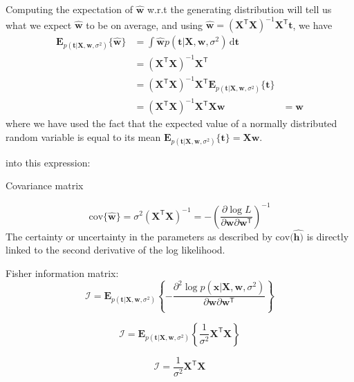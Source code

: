 \documentclass[a4paper,11pt]{article} %
\begin{document}
Computing the expectation of $\hat{\mathbf{w}}$ w.r.t the generating distribution will tell us
what we expect $\hat{\mathbf{w}}$ to be on average, and using
$\hat{\mathbf{w}} = (\mathbf{X}^{\mathsf{T}}\mathbf{X})^{-1}\mathbf{X}^{\mathsf{T}}\mathbf{t}$,
we have
\begin{align*}
\mathbf{E}_{p(\mathbf{t}|\mathbf{X},\mathbf{w},\sigma^2)}\{\hat{\mathbf{w}}\} & =
\int \hat{\mathbf{w}} p(\mathbf{t}|\mathbf{X},\mathbf{w},\sigma^2)\,\mathrm{d}\mathbf{t} \\
& = (\mathbf{X}^{\mathsf{T}}\mathbf{X})^{-1}\mathbf{X}^{\mathsf{T}} \\
& = (\mathbf{X}^{\mathsf{T}}\mathbf{X})^{-1}\mathbf{X}^{\mathsf{T}} 
\mathbf{E}_{p(\mathbf{t}|\mathbf{X},\mathbf{w},\sigma^2)}\{\mathbf{t}\} \\
& = (\mathbf{X}^{\mathsf{T}}\mathbf{X})^{-1}\mathbf{X}^{\mathsf{T}}\mathbf{X}\mathbf{w}
& = \mathbf{w}
\end{align*}
where we have used the fact that the expected value of a normally distributed random
variable is equal to its mean
$\mathbf{E}_{p(\mathbf{t}|\mathbf{X},\mathbf{w},\sigma^2)}\{\mathbf{t}\} =
\mathbf{X}\mathbf{w}$.


into this expression:


Covariance matrix

\begin{equation}
\mathrm{cov}\{\hat{\mathbf{w}}\} = \sigma^2 (\mathbf{X}^{\mathsf{T}}\mathbf{X})^{-1} =
-\left( \frac{\partial\log L}{\partial\mathbf{w}\partial\mathbf{w}^{\mathsf{T}}} \right)^{-1}
\end{equation}
The certainty or uncertainty in the parameters as described by $\mathrm{cov}(\hat{\mathbf{h})}$
is directly linked to the second derivative of the log likelihood.

Fisher information matrix:
\begin{equation}
\mathcal{I} = \mathbf{E}_{p(\mathbf{t}|\mathbf{X},\mathbf{w},\sigma^2)}
\left\{ -\frac{\partial^2\log p(\mathbf{x}|\mathbf{X},\mathbf{w},\sigma^2)}{\partial\mathbf{w}\partial\mathbf{w}^{\mathsf{T}}}
\right\}
\end{equation}

\begin{equation}
\mathcal{I} = \mathbf{E}_{p(\mathbf{t}|\mathbf{X},\mathbf{w},\sigma^2)}
\left\{ \frac{1}{\sigma^2} \mathbf{X}^{\mathsf{T}}\mathbf{X}
\right\}
\end{equation}

\begin{equation}
\mathcal{I} = \frac{1}{\sigma^2} \mathbf{X}^{\mathsf{T}}\mathbf{X}
\end{equation}
\end{document}
